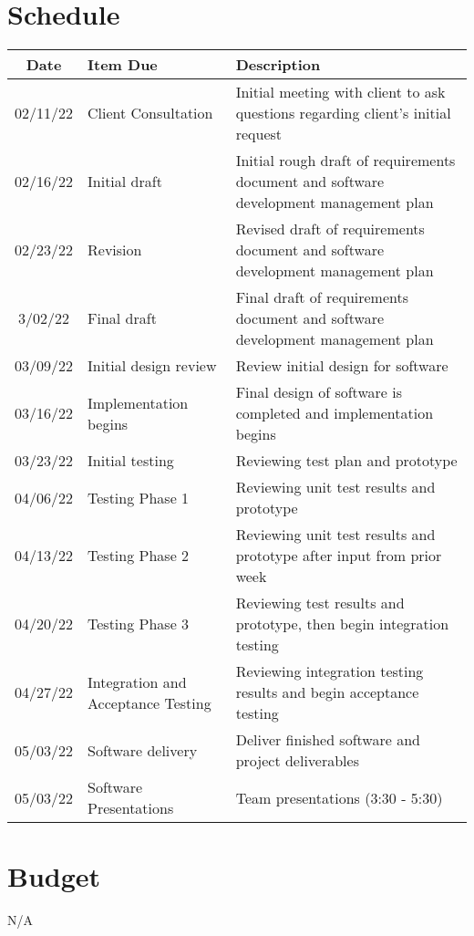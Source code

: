 \documentclass[letterpaper,12pt,oneside,listof=totoc]{scrreprt}
\begin{document}
\section{Schedule} %
\begin{longtable}{| c | p{} | p{} |}
\hline
\textbf{Date} & \textbf{Item Due} & \textbf{Description} \\
\hline
02/11/22 & Client Consultation & Initial meeting with client to ask questions regarding client's initial request \\
\hline
02/16/22 & Initial draft & Initial rough draft of requirements document and software development management plan  \\
\hline
02/23/22 & Revision & Revised draft of requirements document and software development management plan \\
\hline
3/02/22 & Final draft & Final draft of requirements document and software development management plan \\
\hline
03/09/22 & Initial design review & Review initial design for software \\
\hline
03/16/22 & Implementation begins & Final design of software is completed and implementation begins\\
\hline
03/23/22 & Initial testing & Reviewing test plan and prototype \\
\hline
04/06/22 & Testing Phase 1 & Reviewing unit test results and prototype \\
\hline
04/13/22 & Testing Phase 2 & Reviewing unit test results and prototype after input from prior week \\
\hline
04/20/22 & Testing Phase 3 & Reviewing test results and prototype, then begin integration testing \\
\hline
04/27/22 & Integration and Acceptance Testing & Reviewing integration testing results and begin acceptance testing \\
\hline
05/03/22 & Software delivery & Deliver finished software and project deliverables \\
\hline
05/03/22 & Software Presentations & Team presentations (3:30 - 5:30) \\
\hline
\end{longtable}


\section{Budget} %
N/A
\end{document}
